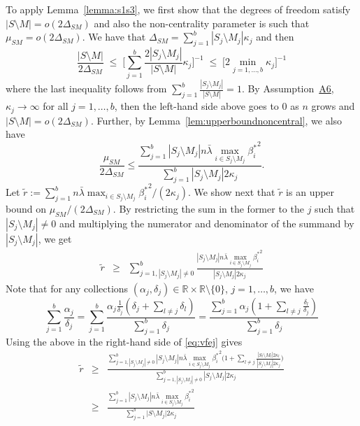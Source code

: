 \documentclass[bj,authoryear]{imsart}
\theoremstyle{plain}
\newcommand{\R}{\mathbb{R}}
\begin{document}
To apply Lemma~\ref{lemma:s1s3}, we first show that the degrees of freedom satisfy $|S\setminus M|=o(2\Delta_{SM})$ and also the non-centrality parameter is such that $\mu_{SM}=o(2\Delta_{SM})$.
We have that $\Delta_{SM}=\sum_{j=1}^b|S_j \setminus M_j|\kappa_j$ and then
$$\frac{|S\setminus M|}{2\Delta_{SM}}\;\leq\; \bigg[\sum_{j=1}^b\frac{2|S_j \setminus M_j|}{|S\setminus M|}\kappa_j \bigg]^{-1} \;\leq\; \Big[ 2\min_{j=1,\ldots,b}\kappa_j \Big]^{-1} $$
where the last inequality follows from $\sum_{j=1}^b\frac{|S_j \setminus M_j|}{|S\setminus M|}=1$. By Assumption~\hyperlink{lab:A6}{A6}, $\kappa_j\to \infty$ for all $j=1,\ldots,b$, then the left-hand side above goes to 0 as $n$ grows and $|S\setminus M|=o(2\Delta_{SM})$. Further, by Lemma~\ref{lem:upperboundnoncentral}, we also have
\begin{equation}\label{eq:AGEoj}
    \frac{\mu_{SM}}{2\Delta_{SM}}\leq \frac{ \sum_{j=1}^b |S_j\setminus M_j|n\bar{\lambda}\max_{i\in S_j\setminus M_j}{\beta_i^*}^2}{\sum_{j=1}^b |S_j\setminus M_j|2 \kappa_j}.
\end{equation}
Let $\tilde{r}:=\sum_{j=1}^b n\bar{\lambda}\max_{i\in S_j\setminus M_j}{\beta_i^*}^2/(2\kappa_j)$. We show next that $\tilde{r}$ is an upper bound  on $\mu_{SM}/(2\Delta_{SM})$. By restricting the sum in the former to the $j$ such that $|S_j\setminus M_j|\neq 0$ and multiplying the numerator and denominator of the summand by $|S_j\setminus M_j|$, we get
\begin{eqnarray}\label{eq:vfej}
    \tilde{r}
    &\geq &\sum_{j=1,|S_j\setminus M_j|\neq 0}^b\frac{|S_j\setminus M_j|n\bar{\lambda}\max_{i\in S_j\setminus M_j}{\beta_i^*}^2}{|S_j\setminus M_j|2\kappa_j} \end{eqnarray}
Note that for any collections $(\alpha_j,\delta_j)\in  \R\times \R\setminus\{0\}$, $j=1,\ldots,b$, we have
\begin{equation}\label{eq:truc}
    \sum_{j=1}^b\frac{\alpha_j}{\delta_j}=
\sum_{j=1}^b\frac{\alpha_j \frac{1}{\delta_j} (\delta_j + \sum_{l \neq j} \delta_l)}{\sum_{j=1}^b \delta_j}=
    \frac{\sum_{j=1}^b\alpha_j(1+\sum_{l\neq j} \frac{\delta_l}{\delta_j})}{\sum_{j=1}^b\delta_j}
\end{equation}
Using the above in the right-hand side of \eqref{eq:vfej} gives
\begin{eqnarray*}
    \tilde{r}
    &\geq& \frac{\sum_{j=1,|S_j\setminus M_j|\neq 0 }^b|S_j\setminus M_j|n\bar{\lambda}\max_{i\in S_j\setminus M_j}{\beta_i^*}^2\Big(1+\sum_{l\neq j}\frac{|S_l\setminus M_l|2\kappa_l}{|S_j\setminus M_j|2\kappa_j}\Big)}{\sum_{j=1,|S_j\setminus M_j|\neq 0 }^b|S_j\setminus M_j|2\kappa_j} \\
    &\geq & \frac{\sum_{j=1}^b|S_j\setminus M_j|n\bar{\lambda}\max_{i\in S_j\setminus M_j}{\beta_i^*}^2}{\sum_{j=1}^b \big|S\setminus M_j\big|2\kappa_j}
\end{eqnarray*}
\end{document}
